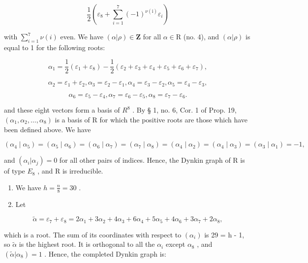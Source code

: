 \[
\frac {1}{2} \left(\varepsilon_ {8} + \sum_ {i = 1} ^ {7} (- 1) ^ {\nu (\mathrm{i})} \varepsilon_ {i}\right)
\]

with \(\sum_{i=1}^{7} \nu(i)\) even. We have \((\alpha|\rho) \in \mathbf{Z}\) for all \(\alpha \in \mathrm{R}\) (no. 4), and \((\alpha|\rho)\) is equal to 1 for the following roots:

\[
\alpha_ {1} = \frac {1}{2} (\varepsilon_ {1} + \varepsilon_ {8}) - \frac {1}{2} (\varepsilon_ {2} + \varepsilon_ {3} + \varepsilon_ {4} + \varepsilon_ {5} + \varepsilon_ {6} + \varepsilon_ {7}),
\]

\[
\alpha_ {2} = \varepsilon_ {1} + \varepsilon_ {2}, \alpha_ {3} = \varepsilon_ {2} - \varepsilon_ {1}, \alpha_ {4} = \varepsilon_ {3} - \varepsilon_ {2}, \alpha_ {5} = \varepsilon_ {4} - \varepsilon_ {3},
\]

\[
\alpha_ {6} = \varepsilon_ {5} - \varepsilon_ {4}, \alpha_ {7} = \varepsilon_ {6} - \varepsilon_ {5}, \alpha_ {8} = \varepsilon_ {7} - \varepsilon_ {6}.
\]

and these eight vectors form a basis of \(R^{8}\) . By § 1, no. 6, Cor. 1 of Prop. 19, \((\alpha_{1}, \alpha_{2}, \ldots, \alpha_{8})\) is a basis of R for which the positive roots are those which have been defined above. We have

\[
\left(\alpha_ {4} \mid \alpha_ {5}\right) = \left(\alpha_ {5} \mid \alpha_ {6}\right) = \left(\alpha_ {6} \mid \alpha_ {7}\right) = \left(\alpha_ {7} \mid \alpha_ {8}\right) = \left(\alpha_ {4} \mid \alpha_ {2}\right) = \left(\alpha_ {4} \mid \alpha_ {3}\right) = \left(\alpha_ {3} \mid \alpha_ {1}\right) = - 1,
\]

and \((\alpha_{i}|\alpha_{j})=0\) for all other pairs of indices. Hence, the Dynkin graph of R is of type \(E_{8}\) , and R is irreducible.

\begin{enumerate}
\def\labelenumi{(\Roman{enumi})}
\setcounter{enumi}{2}
\item
  We have \(h = \frac{n}{8} = 30\) .
\item
  Let
\end{enumerate}

\[
\tilde {\alpha} = \varepsilon_ {7} + \varepsilon_ {8} = 2 \alpha_ {1} + 3 \alpha_ {2} + 4 \alpha_ {3} + 6 \alpha_ {4} + 5 \alpha_ {5} + 4 \alpha_ {6} + 3 \alpha_ {7} + 2 \alpha_ {8},
\]

which is a root. The sum of its coordinates with respect to \((\alpha_{i})\) is 29 = h - 1, so \(\tilde{\alpha}\) is the highest root. It is orthogonal to all the \(\alpha_{i}\) except \(\alpha_{8}\) , and \((\tilde{\alpha}|\alpha_{8}) = 1\) . Hence, the completed Dynkin graph is:

